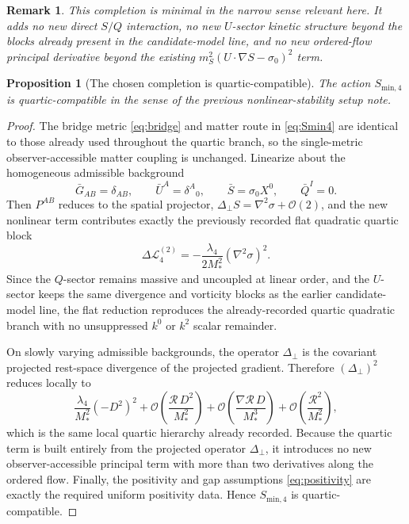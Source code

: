 \documentclass[11pt]{article}
\newtheorem{proposition}{Proposition}
\newtheorem{remark}{Remark}
\begin{document}
\begin{remark}
This completion is \emph{minimal} in the narrow sense relevant here. It adds no new direct \(S/Q\) interaction, no new \(U\)-sector kinetic structure beyond the blocks already present in the candidate-model line, and no new ordered-flow principal derivative beyond the existing \(m_S^2(U\cdot \nabla S-\sigma_0)^2\) term.
\end{remark}

\begin{proposition}[The chosen completion is quartic-compatible]
The action \(S_{\mathrm{min},4}\) is quartic-compatible in the sense of the previous nonlinear-stability setup note.
\end{proposition}

\begin{proof}
The bridge metric \eqref{eq:bridge} and matter route in \eqref{eq:Smin4} are identical to those already used throughout the quartic branch, so the single-metric observer-accessible matter coupling is unchanged. Linearize about the homogeneous admissible background
\begin{equation}
\bar G_{AB}=\delta_{AB},
\qquad
\bar U^A=\delta^A{}_0,
\qquad
\bar S=\sigma_0X^0,
\qquad
\bar Q^I=0.
\label{eq:flatbackground}
\end{equation}
Then \(P^{AB}\) reduces to the spatial projector, \(\Delta_\perp S=\nabla^2\sigma+\mathcal O(2)\), and the new nonlinear term contributes exactly the previously recorded flat quadratic quartic block
\begin{equation}
\Delta\mathcal L^{(2)}_4
=
-\frac{\lambda_4}{2M_*^2}(\nabla^2\sigma)^2.
\label{eq:flatquartic}
\end{equation}
Since the \(Q\)-sector remains massive and uncoupled at linear order, and the \(U\)-sector keeps the same divergence and vorticity blocks as the earlier candidate-model line, the flat reduction reproduces the already-recorded quartic quadratic branch with no unsuppressed \(k^0\) or \(k^2\) scalar remainder.

On slowly varying admissible backgrounds, the operator \(\Delta_\perp\) is the covariant projected rest-space divergence of the projected gradient. Therefore \((\Delta_\perp)^2\) reduces locally to
\begin{equation}
\frac{\lambda_4}{M_*^2}(-D^2)^2
+ \mathcal O\!\left(\frac{\mathcal R\,D^2}{M_*^2}\right)
+ \mathcal O\!\left(\frac{\nabla\mathcal R\,D}{M_*^3}\right)
+ \mathcal O\!\left(\frac{\mathcal R^2}{M_*^2}\right),
\label{eq:localquartic}
\end{equation}
which is the same local quartic hierarchy already recorded. Because the quartic term is built entirely from the projected operator \(\Delta_\perp\), it introduces no new observer-accessible principal term with more than two derivatives along the ordered flow. Finally, the positivity and gap assumptions \eqref{eq:positivity} are exactly the required uniform positivity data. Hence \(S_{\mathrm{min},4}\) is quartic-compatible.
\end{proof}
\end{document}
